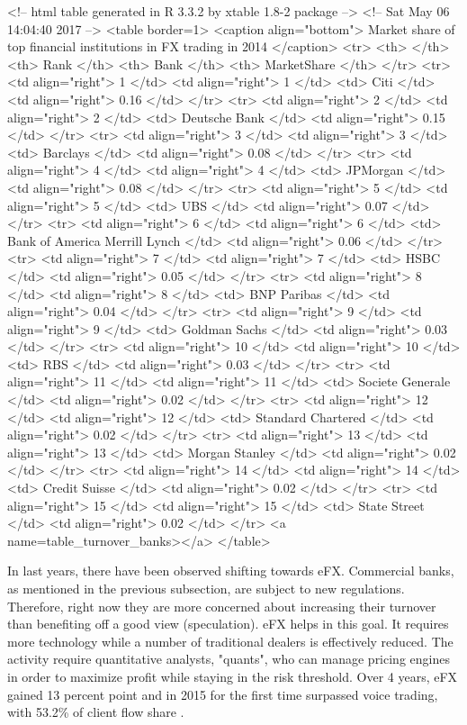 \documentclass{pracamgr_wne}\usepackage[]{graphicx}\usepackage[]{color}
\begin{document}
<!-- html table generated in R 3.3.2 by xtable 1.8-2 package -->
<!-- Sat May 06 14:04:40 2017 -->
<table border=1>
<caption align="bottom"> Market share of top financial institutions in FX trading in 2014 </caption>
<tr> <th>  </th> <th> Rank </th> <th> Bank </th> <th> MarketShare </th>  </tr>
  <tr> <td align="right"> 1 </td> <td align="right">   1 </td> <td> Citi </td> <td align="right"> 0.16 </td> </tr>
  <tr> <td align="right"> 2 </td> <td align="right">   2 </td> <td> Deutsche Bank </td> <td align="right"> 0.15 </td> </tr>
  <tr> <td align="right"> 3 </td> <td align="right">   3 </td> <td> Barclays </td> <td align="right"> 0.08 </td> </tr>
  <tr> <td align="right"> 4 </td> <td align="right">   4 </td> <td> JPMorgan </td> <td align="right"> 0.08 </td> </tr>
  <tr> <td align="right"> 5 </td> <td align="right">   5 </td> <td> UBS </td> <td align="right"> 0.07 </td> </tr>
  <tr> <td align="right"> 6 </td> <td align="right">   6 </td> <td> Bank of America Merrill Lynch </td> <td align="right"> 0.06 </td> </tr>
  <tr> <td align="right"> 7 </td> <td align="right">   7 </td> <td> HSBC </td> <td align="right"> 0.05 </td> </tr>
  <tr> <td align="right"> 8 </td> <td align="right">   8 </td> <td> BNP Paribas </td> <td align="right"> 0.04 </td> </tr>
  <tr> <td align="right"> 9 </td> <td align="right">   9 </td> <td> Goldman Sachs </td> <td align="right"> 0.03 </td> </tr>
  <tr> <td align="right"> 10 </td> <td align="right">  10 </td> <td> RBS </td> <td align="right"> 0.03 </td> </tr>
  <tr> <td align="right"> 11 </td> <td align="right">  11 </td> <td> Societe Generale </td> <td align="right"> 0.02 </td> </tr>
  <tr> <td align="right"> 12 </td> <td align="right">  12 </td> <td> Standard Chartered </td> <td align="right"> 0.02 </td> </tr>
  <tr> <td align="right"> 13 </td> <td align="right">  13 </td> <td> Morgan Stanley </td> <td align="right"> 0.02 </td> </tr>
  <tr> <td align="right"> 14 </td> <td align="right">  14 </td> <td> Credit Suisse </td> <td align="right"> 0.02 </td> </tr>
  <tr> <td align="right"> 15 </td> <td align="right">  15 </td> <td> State Street </td> <td align="right"> 0.02 </td> </tr>
   <a name=table_turnover_banks></a>
</table>

In last years, there have been observed shifting towards eFX. Commercial banks, as mentioned in the previous subsection,
are subject to new regulations. Therefore, right now they are more concerned about increasing their turnover
than benefiting off a good view (speculation). eFX helps in this goal. It requires more technology while a number of traditional dealers
is effectively reduced. The activity require quantitative analysts, "quants", who can manage pricing engines in order to maximize profit while staying in the risk threshold. 
Over 4 years, eFX gained 13 percent point and in 2015 for the first time surpassed voice trading, with 53.2\% of client flow share  \cite{JeffPatterson2015} \cite{Chung2015}. 
\end{document}
